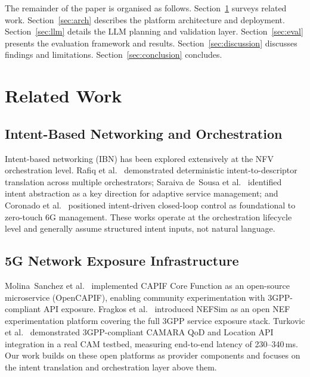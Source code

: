 \documentclass[conference]{IEEEtran}
\begin{document}
The remainder of the paper is organised as follows.
Section~\ref{sec:related} surveys related work.
Section~\ref{sec:arch} describes the platform architecture and deployment.
Section~\ref{sec:llm} details the LLM planning and validation layer.
Section~\ref{sec:eval} presents the evaluation framework and results.
Section~\ref{sec:discussion} discusses findings and limitations.
Section~\ref{sec:conclusion} concludes.

\section{Related Work}
\label{sec:related}

\subsection{Intent-Based Networking and Orchestration}

Intent-based networking (IBN) has been explored extensively at the NFV
orchestration level.
Rafiq et al.~\cite{rafiq2020} demonstrated deterministic
intent-to-descriptor translation across multiple orchestrators;
Saraiva de~Sousa et al.~\cite{saraiva2019} identified intent abstraction
as a key direction for adaptive service management;
and Coronado et al.~\cite{coronado2022} positioned intent-driven
closed-loop control as foundational to zero-touch 6G management.
These works operate at the orchestration lifecycle level and generally
assume structured intent inputs, not natural language.

\subsection{5G Network Exposure Infrastructure}

Molina~Sanchez et al.~\cite{molina2022} implemented CAPIF Core Function
as an open-source microservice (OpenCAPIF), enabling community
experimentation with 3GPP-compliant API exposure.
Fragkos et al.~\cite{nefsim2022} introduced NEFSim as an open NEF
experimentation platform covering the full 3GPP service exposure stack.
Turkovic et al.~\cite{turkovic2025} demonstrated 3GPP-compliant CAMARA
QoD and Location API integration in a real CAM testbed, measuring
end-to-end latency of 230--340\,ms.
Our work builds on these open platforms as provider components and
focuses on the intent translation and orchestration layer above them.
\end{document}
